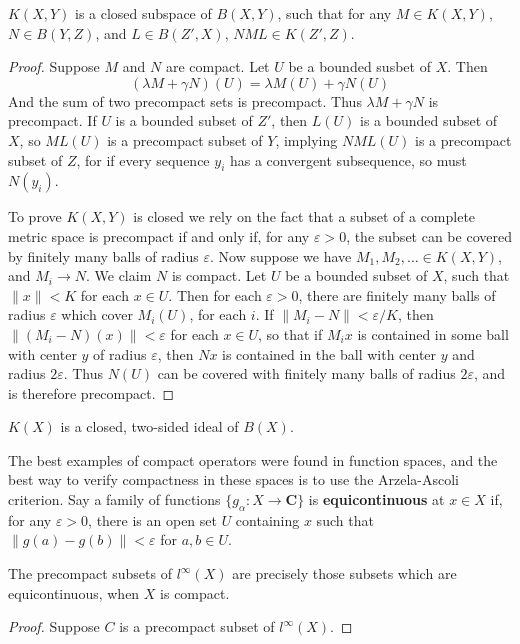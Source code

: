 \begin{theorem}
    $K(X,Y)$ is a closed subspace of $B(X,Y)$, such that for any $M \in K(X,Y)$, $N \in B(Y,Z)$, and $L \in B(Z',X)$, $NML \in K(Z',Z)$.
\end{theorem}
\begin{proof}
    Suppose $M$ and $N$ are compact. Let $U$ be a bounded susbet of $X$. Then
    \[ (\lambda M + \gamma N)(U) = \lambda M(U) + \gamma N(U) \]
    And the sum of two precompact sets is precompact. Thus $\lambda M + \gamma N$ is precompact. If $U$ is a bounded subset of $Z'$, then $L(U)$ is a bounded subset of $X$, so $ML(U)$ is a precompact subset of $Y$, implying $NML(U)$ is a precompact subset of $Z$, for if every sequence $y_i$ has a convergent subsequence, so must $N(y_i)$.

    To prove $K(X,Y)$ is closed we rely on the fact that a subset of a complete metric space is precompact if and only if, for any $\varepsilon > 0$, the subset can be covered by finitely many balls of radius $\varepsilon$. Now suppose we have $M_1, M_2, \dots \in K(X,Y)$, and $M_i \to N$. We claim $N$ is compact. Let $U$ be a bounded subset of $X$, such that $\| x \| < K$ for each $x \in U$. Then for each $\varepsilon > 0$, there are finitely many balls of radius $\varepsilon$ which cover $M_i(U)$, for each $i$. If $\| M_i - N \| < \varepsilon / K$, then $\| (M_i - N)(x) \| < \varepsilon$ for each $x \in U$, so that if $M_i x$ is contained in some ball with center $y$ of radius $\varepsilon$, then $Nx$ is contained in the ball with center $y$ and radius $2 \varepsilon$. Thus $N(U)$ can be covered with finitely many balls of radius $2\varepsilon$, and is therefore precompact.
\end{proof}
\begin{corollary}
    $K(X)$ is a closed, two-sided ideal of $B(X)$.
\end{corollary}

The best examples of compact operators were found in function spaces, and the best way to verify compactness in these spaces is to use the Arzela-Ascoli criterion. Say a family of functions $\{ g_\alpha : X \to \mathbf{C} \}$ is {\bf equicontinuous} at $x \in X$ if, for any $\varepsilon > 0$, there is an open set $U$ containing $x$ such that $\| g(a) - g(b) \| < \varepsilon$ for $a,b \in U$.

\begin{theorem}
    The precompact subsets of $l^\infty(X)$ are precisely those subsets which are equicontinuous, when $X$ is compact.
\end{theorem}
\begin{proof}
    Suppose $C$ is a precompact subset of $l^\infty(X)$.
\end{proof}

